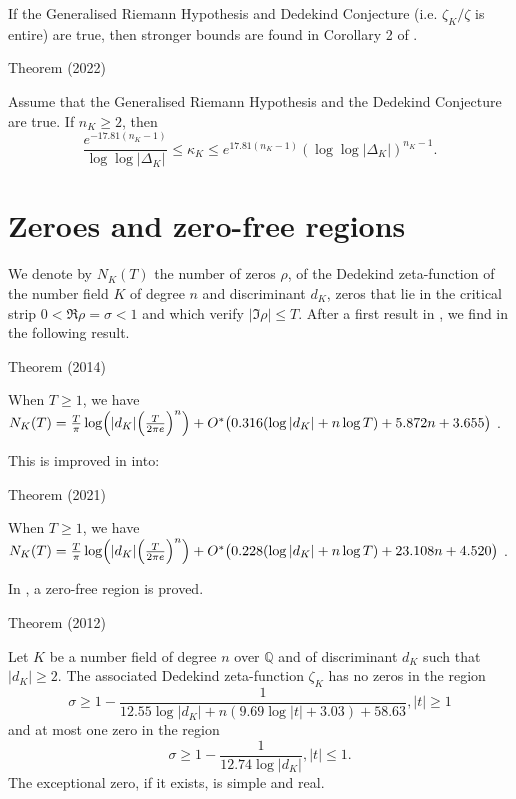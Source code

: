 If the Generalised Riemann Hypothesis and Dedekind Conjecture
(i.e. $\zeta_K/\zeta$ is entire) are
true, then stronger bounds are found in Corollary 2 of
\cite{Garcia-Lee*22b}.
\par 
\begin{thm}{Theorem (2022)}

    Assume that the Generalised Riemann Hypothesis and the Dedekind
    Conjecture are true. If $n_K\geq 2$, then 
$$
    \frac{e^{-17.81(n_K -1)}}{\log\log{|\Delta_K|}} \leq \kappa_{K}
    \leq e^{17.81(n_K -1 )} (\log\log{|\Delta_K|})^{n_K-1} . 
$$
\end{thm}

    


\section{Zeroes and zero-free regions }


We denote by $N_K(T)$ the number of zeros $\rho$, of the Dedekind
zeta-function of the number field $K$ of degree $n$ and discriminant
$d_K$,
zeros that lie in the critical strip
$0 < \Re \rho = \sigma < 1$ and which verify $|\Im \rho|\le T$.
After a first result in
\cite{Kadiri-Ng*12},
we find in
\cite{Trudgian*14-1}
the following result.

\par 
\begin{thm}{Theorem (2014)}

 When $T\ge1$, we have
 $N_K(T)=\frac{T}{\pi}\log\Bigl(|d_K|\Big(\frac{T}{2\pi e}\Bigr)^n\Bigr)
 +O^*\bigl(0.316(\log |d_K|+n\log T)+5.872 n+3.655\bigr)$ .
\end{thm}


This is improved in 
\cite{Hasanalizade-Shen-Wong*21}
into:

\par 
\begin{thm}{Theorem (2021)}

 When $T\ge1$, we have
 $N_K(T)=\frac{T}{\pi}\log\Bigl(|d_K|\Big(\frac{T}{2\pi e}\Bigr)^n\Bigr)
 +O^*\bigl(0.228(\log |d_K|+n\log T)+23.108 n+4.520\bigr)$ .
\end{thm}


In
\cite{Kadiri*12},
a zero-free region is proved.

\par 
\begin{thm}{Theorem (2012)}

Let $K$ be a number field of degree $n$ over $\mathbb{Q}$ and of
discriminant $d_K$ such that $|d_K| \ge 2$. The associated Dedekind
zeta-function $\zeta_K$ has no zeros in the region
$$
\sigma\ge 1-\frac{1}{12.55\log|d_K|+n(9.69\log|t|+3.03)+58.63}, |t|\ge1
$$
and at most one zero in the region
$$
\sigma\ge 1-\frac{1}{12.74\log|d_K|}, |t|\le 1.
$$
The exceptional zero, if it exists, is simple and real.
\end{thm}



